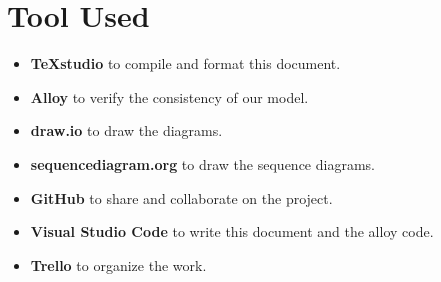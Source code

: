 \section{Tool Used}
\label{s:Tool_Used}%

\begin{itemize}
  \item \textbf{TeXstudio} to compile and format this document.
  \item \textbf{Alloy} to verify the consistency of our model.
  \item \textbf{draw.io} to draw the diagrams.
  \item \textbf{sequencediagram.org} to draw the sequence diagrams.
  \item \textbf{GitHub} to share and collaborate on the project.
  \item \textbf{Visual Studio Code} to write this document and the alloy code.
  \item \textbf{Trello} to organize the work.
\end{itemize}
